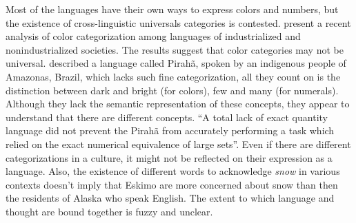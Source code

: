 Most of the languages have their own ways to express colors and numbers, but the existence of cross-linguistic universals 
categories is contested. \cite{regier2003} present a recent analysis of color categorization among languages of
industrialized and nonindustrialized societies. The results suggest that color categories may not be
universal. \cite{everett2005} described a language called Pirahã, spoken by 
an indigenous people of Amazonas, Brazil, which lacks such fine categorization, all they count on is the distinction 
between dark and bright (for colors), few and many (for numerals). 
Although they lack the semantic representation of these concepts, they appear to understand that there are different concepts. 
``A total lack of exact quantity language did not prevent the Pirahã from accurately performing a task which relied on 
the exact numerical equivalence of large sets''\citep{frank2008}.
Even if there are different categorizations in a culture, it might not be reflected on their 
expression as a language. Also, the existence of different words to acknowledge \textit{snow} in various
contexts doesn't imply that Eskimo are more concerned about snow than then the residents of Alaska who speak English.
The extent to which language and thought are bound together is fuzzy and unclear.


